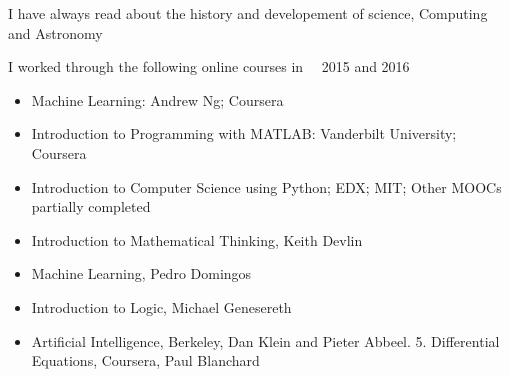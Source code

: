 \documentclass[paper=a4, fontsize=11pt]{scrartcl} %
\numberwithin{equation}{section} %
\numberwithin{figure}{section} %
\numberwithin{table}{section} %
\begin{document}
I have always read about the history and developement of science, Computing and Astronomy


I worked through the following online courses in ~~2015 and 2016

\begin{itemize}
\item  Machine Learning: Andrew Ng; Coursera
\item Introduction to Programming with MATLAB: Vanderbilt University; Coursera
\item Introduction to Computer Science using Python; EDX; MIT;
Other MOOCs partially completed
\item Introduction to Mathematical Thinking, Keith Devlin
\item Machine Learning, Pedro Domingos
\item Introduction to Logic, Michael Genesereth
\item Artificial Intelligence, Berkeley, Dan Klein and Pieter Abbeel. 5. Differential Equations, Coursera, Paul Blanchard
\end{itemize}
\end{document}
